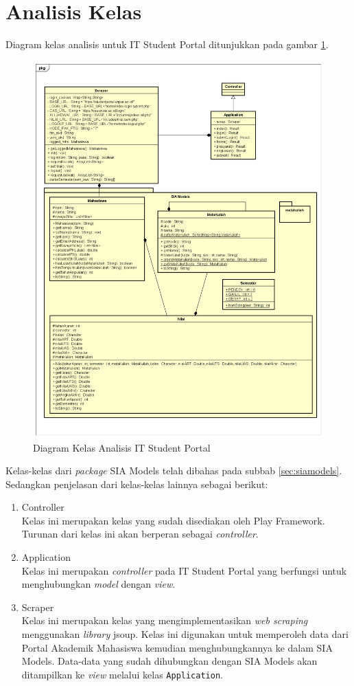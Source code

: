 \section{Analisis Kelas}
Diagram kelas analisis untuk IT Student Portal ditunjukkan pada gambar \ref{fig:3_class_diagram}.
	\begin{figure}[H]
			\centering
			\includegraphics[scale=0.5]{Gambar/class-diagram}
			\caption{Diagram Kelas Analisis IT Student Portal} 
			\label{fig:3_class_diagram}
		\end{figure}
Kelas-kelas dari \textit{package} SIA Models telah dibahas pada subbab \ref{sec:siamodels}. Sedangkan penjelasan dari kelas-kelas lainnya sebagai berikut:
\begin{enumerate}
	\item Controller\\
	Kelas ini merupakan kelas yang sudah disediakan oleh Play Framework. Turunan dari kelas ini akan berperan sebagai \textit{controller}.
	\item Application\\
	Kelas ini merupakan \textit{controller} pada IT Student Portal yang berfungsi untuk menghubungkan \textit{model} dengan \textit{view}. 
	\item Scraper\\
	Kelas ini merupakan kelas yang mengimplementasikan \textit{web scraping} menggunakan \textit{library} jsoup. Kelas ini digunakan untuk memperoleh data dari Portal Akademik Mahasiswa kemudian menghubungkannya ke dalam SIA Models. Data-data yang sudah dihubungkan dengan SIA Models akan ditampilkan ke \textit{view} melalui kelas \texttt{Application}.
\end{enumerate}
		